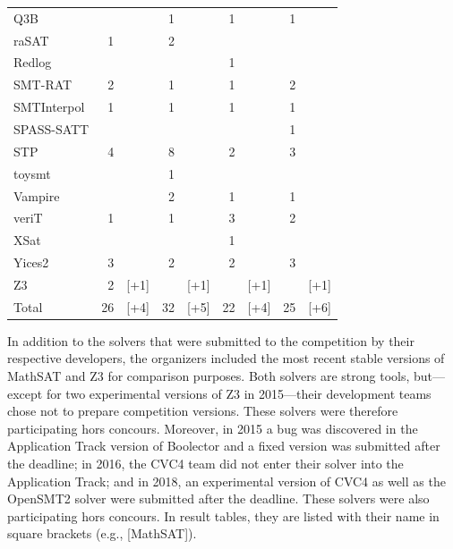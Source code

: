 \documentclass[dvipsnames,table,twoside,11pt]{article}
\newcommand{\apptrack}{Application Track\xspace}
\begin{document}
\begin{table}
\begin{tabular}{lr@{\,\,}rr@{\,\,}rr@{\,\,}rr@{\,\,}r}
    Q3B               &    &      &  1 &      &  1 &      &  1 &      \\
    raSAT             &  1 &      &  2 &      &    &      &    &      \\
    Redlog            &    &      &    &      &  1 &      &    &      \\
    SMT-RAT           &  2 &      &  1 &      &  1 &      &  2 &      \\
    SMTInterpol       &  1 &      &  1 &      &  1 &      &  1 &      \\
    SPASS-SATT        &    &      &    &      &    &      &  1 &      \\
    STP               &  4 &      &  8 &      &  2 &      &  3 &      \\
    toysmt            &    &      &  1 &      &    &      &    &      \\
    Vampire           &    &      &  2 &      &  1 &      &  1 &      \\
    veriT             &  1 &      &  1 &      &  3 &      &  2 &      \\
    XSat              &    &      &    &      &  1 &      &    &      \\
    Yices2            &  3 &      &  2 &      &  2 &      &  3 &      \\
    Z3                &  2 & [+1] &    & [+1] &    & [+1] &    & [+1] \\
    \midrule
    Total             & 26 & [+4] & 32 & [+5] & 22 & [+4] & 25 & [+6] \\
    \bottomrule
  \end{tabular}
\end{table}

In addition to the solvers that were submitted to the competition by
their respective developers, the organizers included the most recent
stable versions of MathSAT and Z3 for comparison purposes.  Both
solvers are strong tools, but---except for two experimental versions
of Z3 in 2015---their development teams chose not to prepare
competition versions.  These solvers were therefore participating hors
concours.  Moreover, in 2015 a bug was discovered in the \apptrack 
version of Boolector and a fixed version was submitted after the
deadline; in 2016, the CVC4 team did not enter their solver into the
\apptrack; and in 2018, an experimental version of CVC4 as
well as the OpenSMT2 solver were submitted after the deadline.  These
solvers were also participating hors concours.  In result tables, they
are listed with their name in square brackets (e.g., [MathSAT]).
\end{document}
